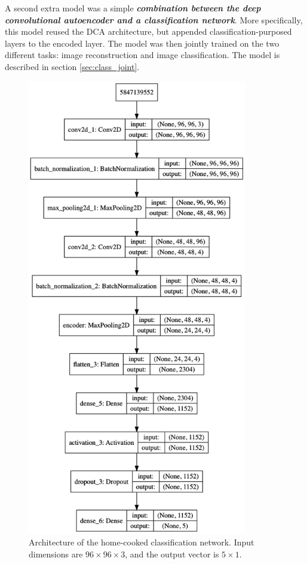 A second extra model was a simple \textbf{\textsl{combination between the deep convolutional autoencoder and a classification network}}. More specifically, this model reused the DCA architecture, but appended classification-purposed layers to the encoded layer. The model was then jointly trained on the two different tasks: image reconstruction and image classification. The model is described in section \textcolor{blue}{\ref{sec:class_joint}}.

\begin{figure}[!htbp]
	\begin{center}
		\includegraphics[height=20cm, keepaspectratio]{images/class_architecture}
		\caption{Architecture of the home-cooked classification network. Input dimensions are $96 \times 96\times3$, and the output vector is $5\times1$.}
		\label{fig:class}
	\end{center}
\end{figure}


